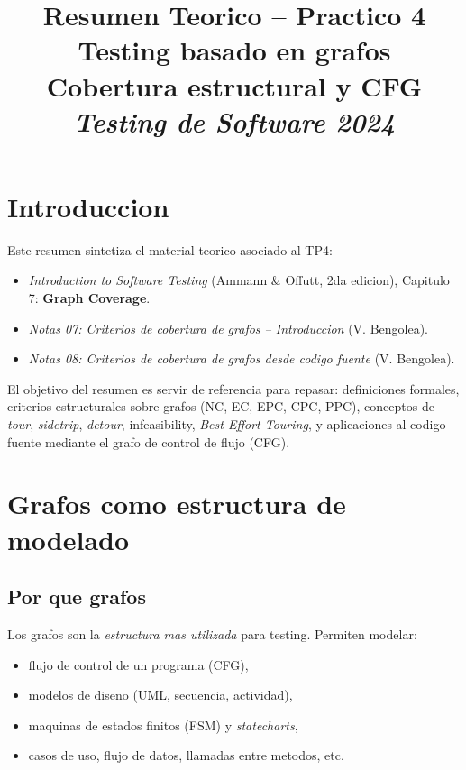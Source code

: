 \documentclass[12pt,a4paper]{article}
\title{\textbf{Resumen Teorico -- Practico 4}\\
Testing basado en grafos\\
Cobertura estructural y CFG\\
\textit{Testing de Software 2024}}
\author{}
\date{}
\begin{document}
\maketitle
\tableofcontents
\newpage

\section*{Introduccion}

Este resumen sintetiza el material teorico asociado al TP4:

\begin{itemize}
  \item \textit{Introduction to Software Testing} (Ammann \& Offutt, 2da edicion), Capitulo 7:
  \textbf{Graph Coverage}.
  \item \textit{Notas 07: Criterios de cobertura de grafos -- Introduccion} (V. Bengolea).
  \item \textit{Notas 08: Criterios de cobertura de grafos desde codigo fuente} (V. Bengolea).
\end{itemize}

El objetivo del resumen es servir de referencia para repasar: definiciones formales, criterios
estructurales sobre grafos (NC, EC, EPC, CPC, PPC), conceptos de \textit{tour}, \textit{sidetrip},
\textit{detour}, infeasibility, \textit{Best Effort Touring}, y aplicaciones al codigo fuente
mediante el grafo de control de flujo (CFG).

\section{Grafos como estructura de modelado}

\subsection{Por que grafos}

Los grafos son la \emph{estructura mas utilizada} para testing. Permiten modelar:
\begin{itemize}
  \item flujo de control de un programa (CFG),
  \item modelos de diseno (UML, secuencia, actividad),
  \item maquinas de estados finitos (FSM) y \textit{statecharts},
  \item casos de uso, flujo de datos, llamadas entre metodos, etc.
\end{itemize}
\end{document}
